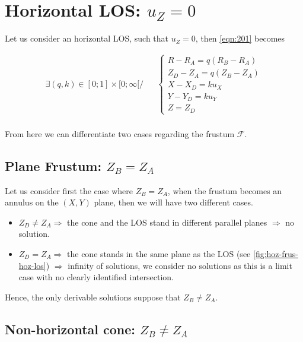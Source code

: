 \documentclass[a4paper,11pt,twoside,titlepage,openright]{book}
\numberwithin{equation}{section}
\begin{document}
\section{Horizontal LOS: $u_Z=0$}

Let us consider an horizontal LOS, such that $u_Z=0$, then \eqref{eqn:201} becomes

$$
\begin{array}{lll}
\exists (q,k) \in [0;1]\times [0;\infty[ /& &
\left\{\begin{array}{ll}
R-R_A = q(R_B-R_A)\\
Z_D-Z_A = q(Z_B-Z_A)\\
X-X_D = ku_X\\
Y-Y_D = ku_Y\\
Z=Z_D
\end{array}\right.\\
\end{array}
$$

From here we can differentiate two cases regarding the frustum $\mathcal{F}$.

\subsection{Plane Frustum: $Z_B = Z_A$}

Let us consider first the case where $Z_B=Z_A$, when the frustum becomes an annulus on the $(X,Y)$ plane, then we will have two different cases.

\begin{itemize}
\item $Z_D\neq Z_A \Rightarrow$ the cone and the LOS stand in different parallel planes $\Rightarrow$ no solution.
\item $Z_D=Z_A \Rightarrow$ the cone stands in the same plane as the LOS (see \ref{fig:hoz-frus-hoz-los}) $\Rightarrow$ infinity of solutions, we consider no solutions as this is a limit case with no clearly identified intersection.
\end{itemize}

\begin{figure}[h]
\end{figure}

Hence, the only derivable solutions suppose that $Z_B\neq Z_A$.

\subsection{Non-horizontal cone: $Z_B\neq Z_A$}
\end{document}
